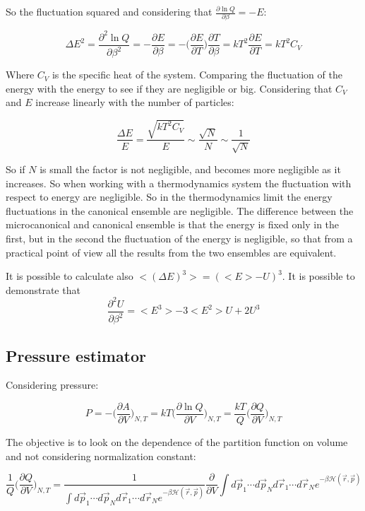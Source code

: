 		So the fluctuation squared and considering that $\frac{\partial\ln Q}{\partial\beta} = -E$:

		$$\Delta E^2 = \frac{\partial^2\ln Q}{\partial\beta^2} = -\frac{\partial E}{\partial\beta} = -\biggl(\frac{\partial E}{\partial T}\biggr)\frac{\partial T}{\partial\beta} = kT^2\frac{\partial E}{\partial T} = kT^2C_V$$

		Where $C_V$ is the specific heat of the system.
		Comparing the fluctuation of the energy with the energy to see if they are negligible or big.
		Considering that $C_V$ and $E$ increase linearly with the number of particles:

		$$\frac{\Delta E}{E} = \frac{\sqrt{kT^2C_V}}{E}\sim\frac{\sqrt{N}}{N}\sim\frac{1}{\sqrt{N}}$$

		So if $N$ is small the factor is not negligible, and becomes more negligible as it increases.
		So when working with a thermodynamics system the fluctuation with respect to energy are negligible.
		So in the thermodynamics limit the energy fluctuations in the canonical ensemble are negligible.
		The difference between the microcanonical and canonical ensemble is that the energy is fixed only in the first, but in the second the fluctuation of the energy is negligible, so that from a practical point of view all the results from the two ensembles are equivalent.

		It is possible to calculate also $<(\Delta E)^3> = (<E> - U)^3$. It is possible to demonstrate that\\
		
		$$
			\frac{\partial^2 U}{\partial \beta^2} = <E^3> - 3 <E^2>U + 2U^3
		$$



	\subsection{Pressure estimator}
	Considering pressure:

	$$P = -\biggl(\frac{\partial A}{\partial V}\biggr)_{N, T} = kT\biggl(\frac{\partial \ln Q}{\partial V}\biggr)_{N, T} = \frac{kT}{Q}\biggl(\frac{\partial Q}{\partial V}\biggr)_{N, T}$$

	The objective is to look on the dependence of the partition function on volume and not considering normalization constant:

	$$\frac{1}{Q}\biggl(\frac{\partial Q}{\partial V}\biggr)_{N, T} = \frac{1}{\int d\vec{p}_1\cdots d\vec{p}_Nd\vec{r}_1\cdots d\vec{r}_Ne^{-\beta\mathcal{H}(\vec{r},\vec{p})}}\frac{\partial}{\partial V}\int d\vec{p}_1\cdots d\vec{p}_Nd\vec{r}_1\cdots d\vec{r}_N e^{-\beta\mathcal{H}(\vec{r},\vec{p})}$$

